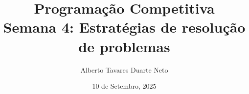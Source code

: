 \documentclass{beamer}
\title{{\Large Programação Competitiva}\\ Semana 4: Estratégias de resolução de problemas}
\date{10 de Setembro, 2025}
\author{Alberto Tavares Duarte Neto}
\institute{Universidade de Brasília}
\numberwithin{equation}{subsection}
\begin{document}
    \maketitle
    \small

    
    
    
    
    
    
    
    
    
    
    


\end{document}
